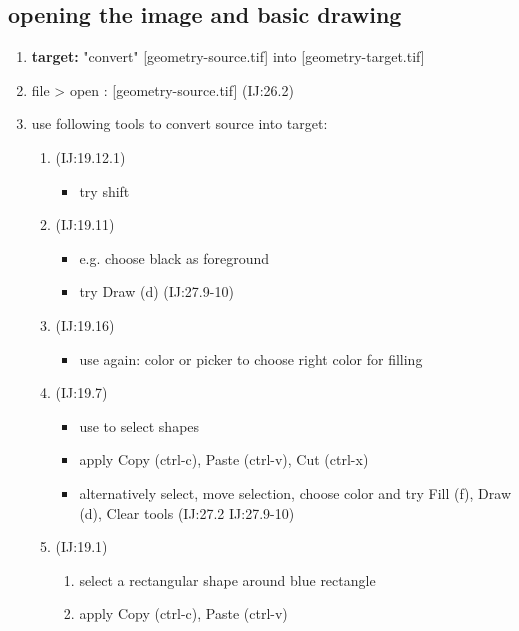 \documentclass[11pt]{article}
\begin{document}
\subsection{opening the image and basic drawing}
\label{sec-1-2}
\begin{enumerate}
\item \textbf{target:} "convert" [geometry-source.tif] into [geometry-target.tif]
\item file > open : [geometry-source.tif] (IJ:26.2)
\item use following tools to convert source into target:
\begin{enumerate}
\item{} (IJ:19.12.1)
\begin{itemize}
\item try shift
\end{itemize}
\item{} (IJ:19.11)
\begin{itemize}
\item e.g. choose black as foreground
\item try Draw (d) (IJ:27.9-10)
\end{itemize}
\item{} (IJ:19.16)
\begin{itemize}
\item use again: color or picker to choose right color for filling
\end{itemize}
\item{} (IJ:19.7)
\begin{itemize}
\item use to select shapes
\item apply Copy (ctrl-c), Paste (ctrl-v), Cut (ctrl-x)
\item alternatively select, move selection, choose color and try Fill (f), Draw (d), Clear tools (IJ:27.2 IJ:27.9-10)
\end{itemize}
\item{} (IJ:19.1)
\begin{enumerate}
\item select a rectangular shape around blue rectangle
\item apply Copy (ctrl-c), Paste (ctrl-v)
\end{enumerate}
\end{enumerate}
\end{enumerate}
\end{document}
